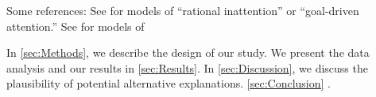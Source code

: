 \Blindtext[2]

Some references: See \cite{Sims2003, Gabaix2014} for models of ``rational inattention'' or ``goal-driven attention.'' See \cite{Bordalo2012, Bordalo2013, Koszegi2013, Taubinsky2014, Bushong2016} for models of 

\blindmathtrue

\blindtext

In \autoref{sec:Methods}, we describe the design of our study. We present the data analysis and our results in \autoref{sec:Results}. In \autoref{sec:Discussion}, we discuss the plausibility of potential alternative explanations. \autoref{sec:Conclusion} .
